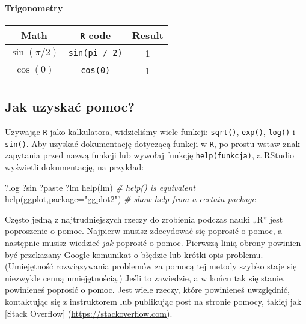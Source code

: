 \documentclass[
]{article}
\newenvironment{Shaded}{\begin{snugshade}}{\end{snugshade}}
\newcommand{\AttributeTok}[1]{\textcolor[rgb]{0.77,0.63,0.00}{#1}}
\newcommand{\CommentTok}[1]{\textcolor[rgb]{0.56,0.35,0.01}{\textit{#1}}}
\newcommand{\FunctionTok}[1]{\textcolor[rgb]{0.00,0.00,0.00}{#1}}
\newcommand{\NormalTok}[1]{#1}
\newcommand{\StringTok}[1]{\textcolor[rgb]{0.31,0.60,0.02}{#1}}
\begin{document}
\hypertarget{trigonometry}{%
\paragraph*{Trigonometry}\label{trigonometry}}

\begin{longtable}[]{@{}ccc@{}}
\toprule
Math & \texttt{R} code & Result \\
\midrule
\endhead
\(\sin(\pi / 2)\) & \texttt{sin(pi\ /\ 2)} & 1 \\
\(\cos(0)\) & \texttt{cos(0)} & 1 \\
\bottomrule
\end{longtable}

\hypertarget{jak-uzyskaux107-pomoc}{%
\subsection{Jak uzyskać pomoc?}\label{jak-uzyskaux107-pomoc}}

Używając \texttt{R} jako kalkulatora, widzieliśmy wiele funkcji:
\texttt{sqrt()}, \texttt{exp()}, \texttt{log()} i \texttt{sin()}. Aby
uzyskać dokumentację dotyczącą funkcji w \texttt{R}, po prostu wstaw
znak zapytania przed nazwą funkcji lub wywołaj funkcję
\texttt{help(funkcja)}, a RStudio wyświetli dokumentację, na przykład:

\begin{Shaded}
\begin{Highlighting}[]
\NormalTok{?log}
\NormalTok{?sin}
\NormalTok{?paste}
\NormalTok{?lm}
\FunctionTok{help}\NormalTok{(lm)   }\CommentTok{\# help() is equivalent}
\FunctionTok{help}\NormalTok{(ggplot,}\AttributeTok{package=}\StringTok{"ggplot2"}\NormalTok{)  }\CommentTok{\# show help from a certain package}
\end{Highlighting}
\end{Shaded}

Często jedną z najtrudniejszych rzeczy do zrobienia podczas nauki „R''
jest poproszenie o pomoc. Najpierw musisz zdecydować się poprosić o
pomoc, a następnie musisz wiedzieć \emph{jak} poprosić o pomoc. Pierwszą
linią obrony powinien być przekazany Google komunikat o błędzie lub
krótki opis problemu. (Umiejętność rozwiązywania problemów za pomocą tej
metody szybko staje się niezwykle cenną umiejętnością.) Jeśli to
zawiedzie, a w końcu tak się stanie, powinieneś poprosić o pomoc. Jest
wiele rzeczy, które powinieneś uwzględnić, kontaktując się z
instruktorem lub publikując post na stronie pomocy, takiej jak {[}Stack
Overflow{]} (\url{https://stackoverflow.com}).
\end{document}
